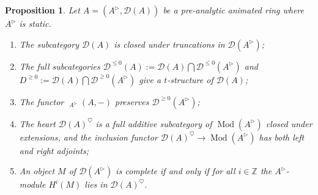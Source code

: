\documentclass{article}
\theoremstyle{plain}
\newtheorem{prop}[thm]{Proposition}
\theoremstyle{definition}
\theoremstyle{remark}
\DeclareMathOperator{\rhoms}{\underline{RHom}}
\DeclareMathOperator{\modcat}{Mod}
\newcommand{\huflag}{\triangleright}
\newcommand{\D}{\mathcal{D}}
\newcommand{\heart}{\heartsuit}
\begin{document}
\begin{prop}
Let $ A = (A ^{\huflag}, \D (A)) $ be a pre-analytic animated ring where $ A ^{\huflag} $ is static.
\begin{enumerate}
\item The subcategory $ \D (A) $ is closed under truncations in $ \D (A ^{\huflag}) $;
\item The full subcategories $ \D ^{\leq 0}(A) := \D (A) \bigcap \D ^{\leq 0}(A ^{\huflag}) $ and $ D ^{\geq 0} := \D (A) \bigcap \D ^{\geq 0} (A ^{\huflag}) $
give a $ t $-structure of $ \D (A) $;
\item The functor $ \rhoms _{A ^{\huflag}}(A, -) $ preserves $ \D ^{\geq 0}(A ^{\huflag}) $;
\item The heart $ \D (A)^{\heart} $ is a full additive subcategory of $ \modcat (A ^{\huflag}) $ closed under extensions,
and the inclusion functor $ \D (A)^{\heart}\to \modcat (A ^{\huflag}) $ has both left and right adjoints;
\item An object $ M $ of $ \D (A ^{\huflag}) $ is complete if and only if for all $ i\in \mathbb{Z} $ the $ A ^{\huflag} $-module
$ H ^{i}(M) $ lies in $ \D (A)^{\heart} $.
\end{enumerate}
\label{definition::tstr}
\end{prop}
\end{document}
